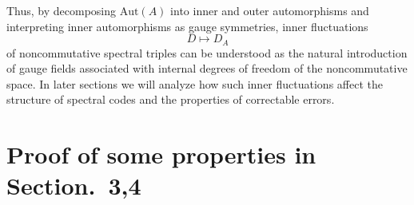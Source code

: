 \documentclass[12pt]{article}
\theoremstyle{definition} %
\theoremstyle{plain} %
\theoremstyle{remark} %
\theoremstyle{underline}
\begin{document}
Thus, by decomposing $\mathrm{Aut}(A)$ into inner and outer automorphisms and
interpreting inner automorphisms as gauge symmetries, inner fluctuations
\[
  D \mapsto D_A
\]
of noncommutative spectral triples can be understood as the natural introduction
of gauge fields associated with internal degrees of freedom of the
noncommutative space.
In later sections we will analyze how such inner fluctuations affect the
structure of spectral codes and the properties of correctable errors.



\section{Proof of some properties in Section.~3,4}\label{app:proof}
\Formal*
\end{document}
